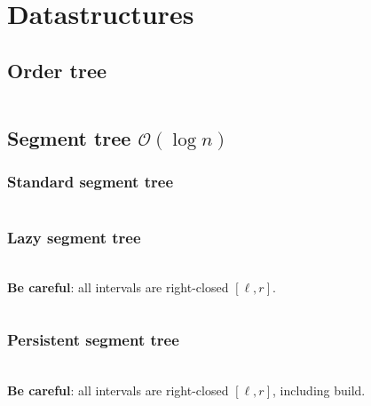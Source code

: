 \documentclass[8pt,a4paper,landscape,oneside]{amsart}
\newcommand{\mintedstyle}[2]{\inputminted[fontsize=\normalsize,baselinestretch=.9,breaklines,breakautoindent,tabsize=2]{#1}{code/#2}}
\newcommand{\code}[1]{\mintedstyle{cpp}{#1}}
\newenvironment{myitemize}
{\begin{itemize}[leftmargin=.3cm]
	\setlength{\itemsep}{0pt}
	\setlength{\parskip}{0pt}
	\setlength{\parsep}{0pt}     }
{ \end{itemize}                  }
\begin{document}
\begin{multicols*}{3}
\begin{myitemize}
\end{myitemize}

\vfill\null \columnbreak
\section{Datastructures}
\subsection{Order tree}
\code{datastructures/order_statistic.cc}

\subsection{Segment tree $\mathcal{O}(\log n)$}

\subsubsection{Standard segment tree}
\code{datastructures/segment_tree.cpp}

\subsubsection{Lazy segment tree} ~\\

\textbf{Be careful}: all intervals are right-closed $[\ell,r]$.
\code{datastructures/lazy_segment_tree.cpp}

\subsubsection{Persistent segment tree} ~\\

\textbf{Be careful}: all intervals are right-closed $[\ell,r]$, including build.
\code{datastructures/persistent_segment_tree.cpp}


\end{multicols*}
\end{document}
